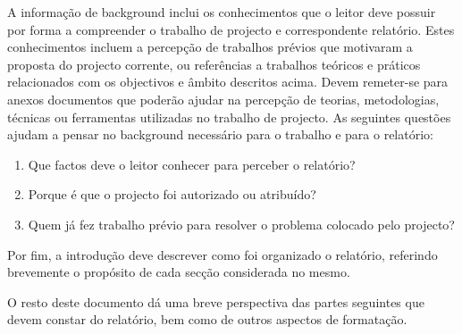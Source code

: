 A informação de background inclui os conhecimentos que o leitor deve possuir por forma a compreender o trabalho de projecto e correspondente relatório. Estes conhecimentos incluem a percepção de trabalhos prévios que motivaram a proposta do projecto corrente, ou referências a trabalhos teóricos e práticos relacionados com os objectivos e âmbito descritos acima. Devem remeter-se para anexos documentos que poderão ajudar na percepção de teorias, metodologias, técnicas ou ferramentas utilizadas no trabalho de projecto. As seguintes questões ajudam a pensar no background necessário para o trabalho e para o relatório:

\begin{enumerate}
 \item Que factos deve o leitor conhecer para perceber o relatório?
 \item Porque é que o projecto foi autorizado ou atribuído?
 \item Quem já fez trabalho prévio para resolver o problema colocado pelo projecto?
\end{enumerate}

Por fim, a introdução deve descrever como foi organizado o relatório, referindo brevemente o propósito de cada secção considerada no mesmo.

O resto deste documento dá uma breve perspectiva das partes seguintes que devem constar do relatório, bem como de outros aspectos de formatação.